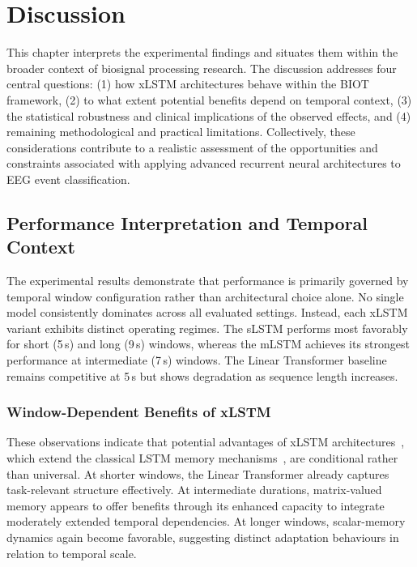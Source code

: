\cleardoubleoddpage
\chapter{Discussion}
\label{sec:discussion}

This chapter interprets the experimental findings and situates them within the broader context of biosignal processing research. The discussion addresses four central questions: (1) how \ac{xLSTM} architectures behave within the \ac{BIOT} framework, (2) to what extent potential benefits depend on temporal context, (3) the statistical robustness and clinical implications of the observed effects, and (4) remaining methodological and practical limitations. Collectively, these considerations contribute to a realistic assessment of the opportunities and constraints associated with applying advanced recurrent neural architectures to \ac{EEG} event classification.

\section{Performance Interpretation and Temporal Context}
\label{sec:performance_analysis}

The experimental results demonstrate that performance is primarily governed by temporal window configuration rather than architectural choice alone. No single model consistently dominates across all evaluated settings. Instead, each \ac{xLSTM} variant exhibits distinct operating regimes. The \ac{sLSTM} performs most favorably for short (5\,s) and long (9\,s) windows, whereas the \ac{mLSTM} achieves its strongest performance at intermediate (7\,s) windows. The Linear Transformer baseline remains competitive at 5\,s but shows degradation as sequence length increases.

\subsection{Window-Dependent Benefits of xLSTM}
\label{sec:temporal_modeling}

These observations indicate that potential advantages of \ac{xLSTM} architectures~\cite{beck2024xlstm}, which extend the classical \ac{LSTM} memory mechanisms~\cite{hochreiter1997lstm}, are conditional rather than universal. At shorter windows, the Linear Transformer already captures task-relevant structure effectively. At intermediate durations, matrix-valued memory appears to offer benefits through its enhanced capacity to integrate moderately extended temporal dependencies. At longer windows, scalar-memory dynamics again become favorable, suggesting distinct adaptation behaviours in relation to temporal scale.

